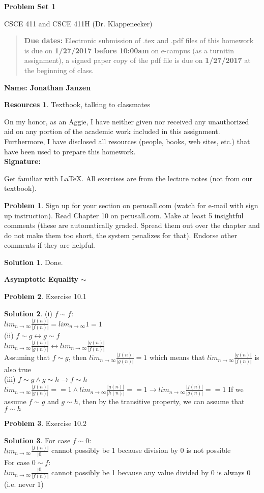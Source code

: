 \documentclass{article}
\theoremstyle{definition}
\newtheorem{problem}{Problem}
\newtheorem*{solution}{Solution}
\newtheorem*{resources}{Resources}
\newcommand{\name}[1]{\noindent\textbf{Name: #1}}
\newcommand{\honor}{\noindent On my honor, as an Aggie, I have neither
  given nor received any unauthorized aid on any portion of the
  academic work included in this assignment. Furthermore, I have
  disclosed all resources (people, books, web sites, etc.) that have
  been used to prepare this homework. \\[1ex]
 \textbf{Signature:} \underline{\hspace*{5cm}} }
\newcommand{\problemset}[1]{\begin{center}\textbf{Problem Set #1}\end{center}}
\newcommand{\duedate}[2]{\begin{quote}\textbf{Due dates:} Electronic submission of .tex
    and .pdf files of this homework is due on \textbf{#1} on e-campus
    (as a turnitin assignment), a signed paper copy
    of the pdf file is due on \textbf{#2} at the beginning of
    class. \end{quote} }
\begin{document}
\problemset{1}
\centerline{CSCE 411 and CSCE 411H (Dr. Klappenecker) }

\duedate{1/27/2017 before 10:00am}{1/27/2017}
\name{ Jonathan Janzen}
\begin{resources} Textbook, talking to classmates
\end{resources}
\honor

\newpage%
\noindent Get familiar with \LaTeX. All exercises are from the lecture notes
(not from our textbook). \medskip

\begin{problem}
Sign up for your section on perusall.com (watch for e-mail with sign
up instruction). Read Chapter 10 on perusall.com. Make at least 5
insightful comments (these are automatically graded. Spread them out
over the chapter and do not make them too short, the system penalizes
for that). Endorse other comments if they are helpful. 
\end{problem}
\begin{solution}
Done.
\end{solution}

\noindent \textbf{Asymptotic Equality} $\mathbf{\sim}$
\begin{problem}
Exercise 10.1
\begin{solution}
(i) $f  \sim f$:\\
$lim_{n\rightarrow\infty} \frac{|f(n)|}{|f(n)|} = lim_{n\rightarrow\infty} 1 = 1$\\
(ii) $f \sim g \leftrightarrow g \sim f$\\
$lim_{n\rightarrow\infty} \frac{|f(n)|}{|g(n)|} \leftrightarrow lim_{n\rightarrow\infty} \frac{|g(n)|}{|f(n)|}$\\
Assuming that $f \sim g$, then $lim_{n\rightarrow\infty} \frac{|f(n)|}{|g(n)|} = 1$ which means that $lim_{n\rightarrow\infty} \frac{|g(n)|}{|f(n)|}$ is also true\\
(iii) $f \sim g \land g \sim h \rightarrow f \sim h$\\
$lim_{n\rightarrow\infty} \frac{|f(n)|}{|g(n)|} == 1 \land lim_{n\rightarrow\infty} \frac{|g(n)|}{|h(n)|} == 1 \rightarrow lim_{n\rightarrow\infty} \frac{|f(n)|}{|g(n)|} == 1$
If we assume $f \sim g$ and $g \sim h$, then by the transitive property, we can assume that $f \sim h$
\end{solution}
\end{problem}

\begin{problem}
Exercise 10.2
\begin{solution}
For case $f \sim 0$:\\
$lim_{n\rightarrow\infty} \frac{|f(n)|}{|0|}$ cannot possibly be 1 because division by 0 is not possible\\
For case $0 \sim f$:\\
$lim_{n\rightarrow\infty} \frac{|0|}{|f(n)|}$ cannot possibly be 1 because any value divided by 0 is always 0 (i.e. never 1)\\
\end{solution}
\end{problem}
\end{document}
